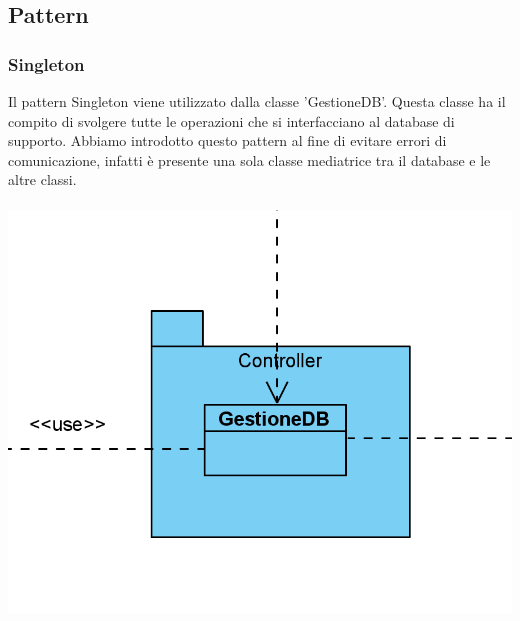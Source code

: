 \documentclass[a4paper, titlepage]{article}
\begin{document}
\subsection{Pattern}
\subsubsection{Singleton}
Il pattern Singleton viene utilizzato dalla classe 'GestioneDB'. Questa classe ha il compito di svolgere tutte le operazioni che si interfacciano al database di supporto. Abbiamo introdotto questo pattern al fine di evitare errori di comunicazione, infatti è presente una sola classe mediatrice tra il database e le altre classi.\\\\
\includegraphics[scale=0.80]{Immagini/Singleton.png}
\end{document}
